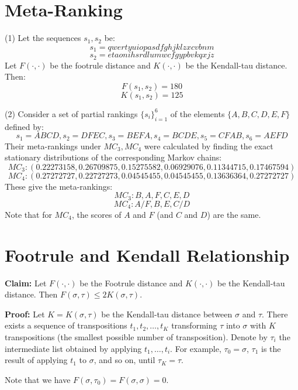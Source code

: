 \documentclass[11pt,letterpaper]{article}
\begin{document}
\section{Meta-Ranking}
(1) Let the sequences $s_1, s_2$ be:
\[ s_1 = q w e r t y u i o p a s d f g h j k l z x c v b n m \]
\[ s_2 = e t a o n i h s r d l u m w c f g y p b v k q x j z \]
Let $F(\cdot, \cdot)$ be the footrule distance and $K(\cdot, \cdot)$ be the Kendall-tau distance. Then:
\[ F(s_1, s_2) = 180 \]
\[ K(s_1, s_2) = 125 \]

(2)
Consider a set of partial rankings $\{s_i\}_{i=1}^6$ of the elements $\{A,B,C,D,E,F\}$ defined by:
\[ s_1 = A B C D, s_2 = D F E C, s_3 = B E F A, s_4 = B C D E, s_5 = C F A B, s_6 = A E F D \]
Their meta-rankings under $MC_3, MC_4$ were calculated by finding the exact stationary distributions of the corresponding Markov chains:
\[ MC_3: (0.22273158, 0.26709875, 0.15275582, 0.06929076, 0.11344715, 0.17467594) \]
\[ MC_4: (0.27272727, 0.22727273, 0.04545455, 0.04545455, 0.13636364, 0.27272727) \]
These give the meta-rankings:
\[ MC_3: B, A, F, C, E, D \]
\[ MC_4: A/F,  B, E,  C/D \]
Note that for $MC_4$, the scores of $A$ and $F$ (and $C$ and $D$) are the same.


\section{Footrule and Kendall Relationship}
\textbf{Claim: }Let $F(\cdot, \cdot)$ be the Footrule distance and $K(\cdot, \cdot)$ be the Kendall-tau distance. Then $F(\sigma, \tau) \leq 2 K(\sigma, \tau)$.

\textbf{Proof: } %
Let $K = K(\sigma, \tau)$ be the Kendall-tau distance between $\sigma$ and $\tau$. There exists a sequence of transpositions $t_1, t_2, \ldots, t_K$ transforming $\tau$ into $\sigma$ with $K$ transpositions (the smallest possible number of transposition). Denote by $\tau_i$ the intermediate list obtained by applying $t_1, \ldots, t_i$. For example, $\tau_0 = \sigma$, $\tau_1$ is the result of applying $t_1$ to $\sigma$, and so on, until $\tau_K = \tau$.

Note that we have $F(\sigma, \tau_0) = F(\sigma, \sigma) = 0$.
\end{document}
